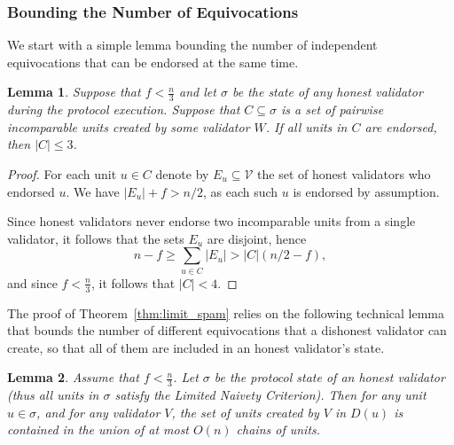 \documentclass[12pt, fleqn]{article}
\newtheorem{lemma}{Lemma}
\newcommand{\cV}{\mathcal{V}}
\begin{document}
\subsubsection{Bounding the Number of Equivocations}
We start with a simple lemma bounding the number of independent equivocations that can be endorsed at the same time.
\begin{lemma}\label{lem:limit_endors}
Suppose that $f<\frac{n}{3}$ and let $\sigma$ be the state of any honest validator during the protocol execution. %
Suppose that $C\subseteq \sigma $ is a set of pairwise incomparable units created by some validator $W$.
%
If all units in $C$ are endorsed, then $|C|\leq 3$. 
\end{lemma}
\begin{proof}
For each unit $u \in C$ denote by $E_u \subseteq \cV$ the set of honest validators who endorsed $u$.
%
We have $|E_u|+f >n/2$, as each such $u$ is endorsed by assumption.
%

Since honest validators never endorse two incomparable units from a single validator, it follows that the sets $E_u$ are disjoint, hence
$$n-f \geq \sum_{u\in C} |E_u| > |C|(n/2 - f),$$
and since $f<\frac{n}{3}$, it follows that $|C|<4$.
\end{proof}
The proof of Theorem~\ref{thm:limit_spam} relies on the following technical lemma that bounds the number of different equivocations that a dishonest validator can create, so that all of them are included in an honest validator's state.
\begin{lemma}\label{chainBoundLemma}
Assume that $f< \frac{n}{3}$.
%
Let $\sigma$ be the protocol state of an honest validator (thus all units in $\sigma$ satisfy the Limited Naivety Criterion). Then for any unit $u\in \sigma$, and for any validator $V$, the set of units created by $V$ in $D(u)$ is contained in the union of at most $O(n)$ chains of units.
\end{lemma}
\end{document}

